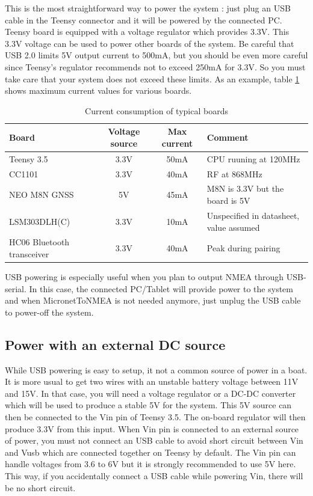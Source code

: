 \documentclass{report}
\begin{document}
This is the most straightforward way to power the system : just plug an USB cable in the Teensy connector and it will be powered by the connected PC. Teensy board is equipped with a voltage regulator which provides 3.3V. This 3.3V voltage can be used to power other boards of the system.
Be careful that USB 2.0 limits 5V output current to 500mA, but you should be even more careful since Teensy's regulator recommends not to exceed 250mA for 3.3V. So you must take care that your system does not exceed these limits.
As an example, table \ref{table:boardconsumption} shows maximum current values for various boards.

\begin{table}[h]
	\begin{tabular}{|l|c|c|l|}
		\hline
		Board & Voltage source & Max current & Comment \\
		\hline
		Teensy 3.5 & 3.3V & 50mA & CPU ruuning at 120MHz\\
		CC1101 & 3.3V & 40mA & RF at 868MHz\\
		NEO M8N GNSS & 5V & 45mA & M8N is 3.3V but the board is 5V\\
		LSM303DLH(C) & 3.3V & 10mA & Unspecified in datasheet, value assumed\\
		HC06 Bluetooth transceiver & 3.3V & 40mA & Peak during pairing\\
		\hline
	\end{tabular}
	\caption{Current consumption of typical boards}
	\label{table:boardconsumption}
\end{table}
USB powering is especially useful when you plan to output NMEA through USB-serial. In this case, the connected PC/Tablet will provide power to the system and when MicronetToNMEA is not needed anymore, just unplug the USB cable to power-off the system.

\subsection{Power with an external DC source}
While USB powering is easy to setup, it not a common source of power in a boat. It is more usual to get two wires with an unstable battery voltage between 11V and 15V. In that case, you will need a voltage regulator or a DC-DC converter which will be used to produce a stable 5V for the system. This 5V source can then be connected to the Vin pin of Teensy 3.5. The on-board regulator will then produce 3.3V from this input.
\linebreak
When Vin pin is connected to an external source of power, you must not connect an USB cable to avoid short circuit between Vin and Vusb which are connected together on Teensy by default. The Vin pin can handle voltages from 3.6 to 6V but it is strongly recommended to use 5V here. This way, if you accidentally connect a USB cable while powering Vin, there will be no short circuit.
\end{document}
